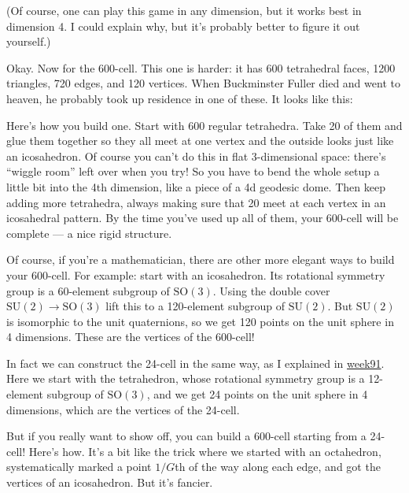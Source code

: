 \documentclass{article}
\def\tightlist{}
\renewcommand{\texttt}[1]{%
  \begingroup
  \ttfamily
  \begingroup\lccode`~=`/\lowercase{\endgroup\def~}{/\discretionary{}{}{}}%
  \begingroup\lccode`~=`[\lowercase{\endgroup\def~}{[\discretionary{}{}{}}%
  \begingroup\lccode`~=`.\lowercase{\endgroup\def~}{.\discretionary{}{}{}}%
  \catcode`/=\active\catcode`[=\active\catcode`.=\active
  \scantokens{#1\noexpand}%
  \endgroup
}
\begin{document}
(Of course, one can play this game in any dimension, but it works best
in dimension 4. I could explain why, but it's probably better to figure
it out yourself.)

Okay. Now for the 600-cell. This one is harder: it has 600 tetrahedral
faces, 1200 triangles, 720 edges, and 120 vertices. When Buckminster
Fuller died and went to heaven, he probably took up residence in one of
these. It looks like this:


Here's how you build one. Start with 600 regular tetrahedra. Take 20 of
them and glue them together so they all meet at one vertex and the
outside looks just like an icosahedron. Of course you can't do this in
flat \(3\)-dimensional space: there's ``wiggle room'' left over when you
try! So you have to bend the whole setup a little bit into the 4th
dimension, like a piece of a 4d geodesic dome. Then keep adding more
tetrahedra, always making sure that 20 meet at each vertex in an
icosahedral pattern. By the time you've used up all of them, your
600-cell will be complete --- a nice rigid structure.

Of course, if you're a mathematician, there are other more elegant ways
to build your 600-cell. For example: start with an icosahedron. Its
rotational symmetry group is a 60-element subgroup of
\(\mathrm{SO}(3)\). Using the double cover
\(\mathrm{SU}(2) \to \mathrm{SO}(3)\) lift this to a 120-element
subgroup of \(\mathrm{SU}(2)\). But \(\mathrm{SU}(2)\) is isomorphic to
the unit quaternions, so we get 120 points on the unit sphere in 4
dimensions. These are the vertices of the 600-cell!

In fact we can construct the 24-cell in the same way, as I explained in
\href{week91.html}{week91}. Here we start with the tetrahedron, whose
rotational symmetry group is a 12-element subgroup of
\(\mathrm{SO}(3)\), and we get 24 points on the unit sphere in 4
dimensions, which are the vertices of the 24-cell.

But if you really want to show off, you can build a 600-cell starting
from a 24-cell! Here's how. It's a bit like the trick where we started
with an octahedron, systematically marked a point \(1/G\)th of the way
along each edge, and got the vertices of an icosahedron. But it's
fancier.
\end{document}
